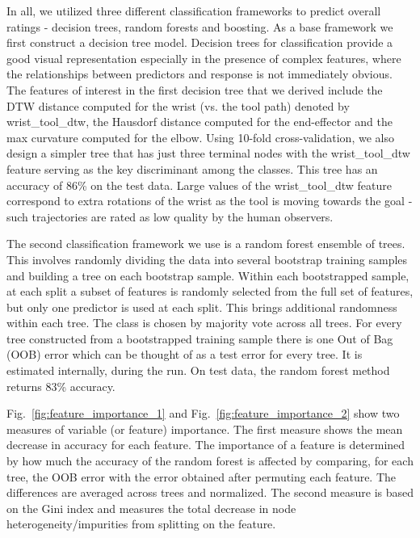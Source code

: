 \documentclass[letterpaper, 10 pt, conference]{ieeeconf}  %
\begin{document}
In all, we utilized three different classification frameworks to predict overall ratings - decision trees, random forests and boosting. As a base framework we first construct a decision tree model.  Decision trees for classification provide a good visual representation especially in the presence of complex features, where the relationships between predictors and response is not immediately obvious. The features of interest in the first decision tree that we derived include the DTW distance computed for the wrist (vs. the tool path) denoted by wrist\_tool\_dtw, the Hausdorf distance computed for the end-effector and the max curvature computed for the elbow. Using 10-fold cross-validation, we also design a simpler tree that has just three terminal nodes with the wrist\_tool\_dtw feature serving as the key discriminant among the classes. This tree has an accuracy of 86\% on the test data. Large values of the wrist\_tool\_dtw feature correspond to extra rotations of the wrist as the tool is moving towards the goal - such trajectories are rated as low quality by the human observers. 

The second classification framework we use is a random forest ensemble of trees. This involves randomly dividing the data into several bootstrap training samples and building a tree on each bootstrap sample. Within each bootstrapped sample, at each split a subset of features is randomly selected from the full set of features, but only one predictor is used at each split. This brings additional randomness within each tree. The class is chosen by majority vote across all trees. For every tree constructed from a bootstrapped training sample there is one Out of Bag (OOB) error which can be thought of as a test error for every tree. It is estimated internally, during the run. On test data, the random forest method returns 83\% accuracy. 

Fig.~\ref{fig:feature_importance_1} and Fig.~\ref{fig:feature_importance_2} show two measures of variable (or feature) importance. The first measure shows the mean decrease in accuracy for each feature. The importance of a feature is determined by how much the accuracy of the random forest is affected by comparing, for each tree, the OOB error with the error obtained after permuting each feature. The differences are averaged across trees and normalized.  The second measure is based on the Gini index and measures the total decrease in node heterogeneity/impurities from splitting on the feature.  
\end{document}

